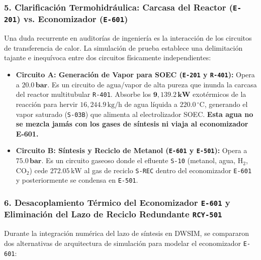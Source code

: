 \documentclass[11pt,a4paper]{article}
\begin{document}
\subsubsection{5. Clarificación Termohidráulica: Carcasa del Reactor (\texttt{E-201}) vs. Economizador (\texttt{E-601})}
Una duda recurrente en auditorías de ingeniería es la interacción de los circuitos de transferencia de calor. La simulación de prueba establece una delimitación tajante e inequívoca entre dos circuitos físicamente independientes:
\begin{itemize}
    \item \textbf{Circuito A: Generación de Vapor para SOEC (\texttt{E-201} y \texttt{R-401}):} Opera a $\mathbf{20.0\,\text{bar}}$. Es un circuito de agua/vapor de alta pureza que inunda la carcasa del reactor multitubular \texttt{R-401}. Absorbe los $\mathbf{9{,}139.2\,\text{kW}}$ exotérmicos de la reacción para hervir $16{,}244.9\,\text{kg/h}$ de agua líquida a $220.0\,^\circ\text{C}$, generando el vapor saturado (\texttt{S-03B}) que alimenta al electrolizador SOEC. \textbf{Esta agua no se mezcla jamás con los gases de síntesis ni viaja al economizador E-601.}
    \item \textbf{Circuito B: Síntesis y Reciclo de Metanol (\texttt{E-601} y \texttt{E-501}):} Opera a $\mathbf{75.0\,\text{bar}}$. Es un circuito gaseoso donde el efluente \texttt{S-10} (metanol, agua, $\text{H}_2$, $\text{CO}_2$) cede $272.05\,\text{kW}$ al gas de reciclo \texttt{S-REC} dentro del economizador \texttt{E-601} y posteriormente se condensa en \texttt{E-501}.
\end{itemize}

\subsubsection{6. Desacoplamiento Térmico del Economizador \texttt{E-601} y Eliminación del Lazo de Reciclo Redundante \texttt{RCY-501}}
Durante la integración numérica del lazo de síntesis en DWSIM, se compararon dos alternativas de arquitectura de simulación para modelar el economizador \texttt{E-601}:
\end{document}
